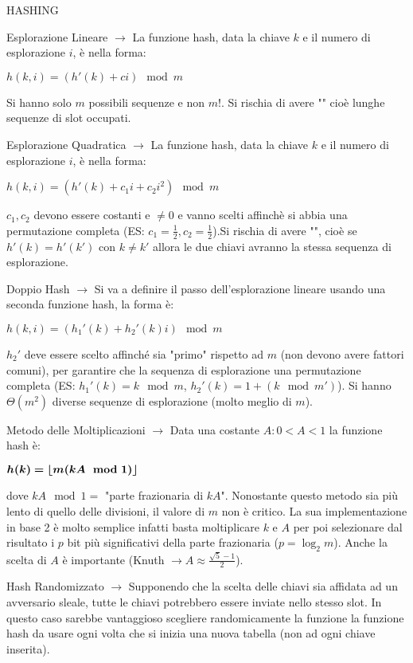 \documentclass[8pt]{extarticle}
\begin{document}
\begin{formulario}
\begin{myParagraph}{HASHING}
\begin{descr}{0}
\begin{descr}{0}
\begin{descr}{0}
\begin{descr}{0}
								\item[Esplorazione Lineare] $\rightarrow$ La funzione hash, data la chiave $k$ e il numero di esplorazione $i$, è nella forma:
									\begin{tcenter}
										$h(k,i)=(h'(k)+ci)\mod m$
									\end{tcenter}
Si hanno solo $m$ possibili sequenze e non $m!$. Si rischia di avere "" cioè lunghe sequenze di slot occupati.
								\item[Esplorazione Quadratica] $\rightarrow$ La funzione hash, data la chiave $k$ e il numero di esplorazione $i$, è nella forma:
									\begin{tcenter}
										$h(k,i)=(h'(k)+c_1i+c_2i^2)\mod m$
									\end{tcenter}
$c_1,c_2$ devono essere costanti e $\neq0$ e vanno scelti affinchè si abbia una permutazione completa (ES: $c_1=\frac{1}{2},c_2=\frac{1}{2}$).Si rischia di avere "", cioè se $h'(k)=h'(k')$ con $k\neq k'$ allora le due chiavi avranno la stessa sequenza di esplorazione.
								\item[Doppio Hash] $\rightarrow$ Si va a definire il passo dell'esplorazione lineare usando una seconda funzione hash, la forma è:
									\begin{tcenter}
										$h(k,i)=(h_1'(k)+h_2'(k)i)\mod m$
									\end{tcenter}
$h_2'$ deve essere scelto affinché sia "primo" rispetto ad $m$ (non devono avere fattori comuni), per garantire che la sequenza di esplorazione una permutazione completa (ES: $h_1'(k)=k \mod m$, $h_2'(k)=1+(k \mod m')$). Si hanno $\Theta(m^2)$ diverse sequenze di esplorazione (molto meglio di $m$).
							\end{descr}
								\item[Metodo delle Moltiplicazioni] $\rightarrow$ Data una costante $A: 0<A<1$ la funzione hash è:
									\begin{tcenter}
										$\bm{h(k)=\lfloor m(kA \mod 1) \rfloor}$
									\end{tcenter}
dove $kA \mod 1=$ "parte frazionaria di $kA$". Nonostante questo metodo sia più lento di quello delle divisioni, il valore di $m$ non è critico. La sua implementazione in base 2 è molto semplice infatti basta moltiplicare $k$ e $A$ per poi selezionare dal risultato i $p$ bit più significativi della parte frazionaria ($p=\log_2 m$). Anche la scelta di $A$ è importante (Knuth $\rightarrow A\approx \frac{\sqrt{5}-1}{2}$).
								\item[Hash Randomizzato] $\rightarrow$ Supponendo che la scelta delle chiavi sia affidata ad un avversario sleale, tutte le chiavi potrebbero essere inviate nello stesso slot. In questo caso sarebbe vantaggioso scegliere randomicamente la funzione la funzione hash da usare ogni volta che si inizia una nuova tabella (non ad ogni chiave inserita). 

\end{descr}
\end{descr}
\end{descr}
\end{myParagraph}
\end{formulario}
\end{document}
